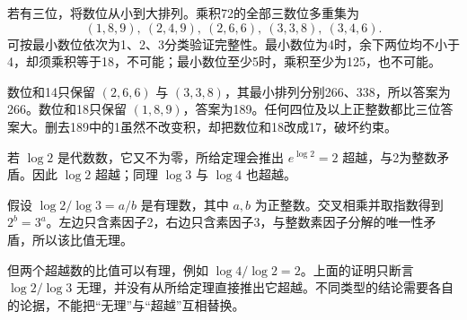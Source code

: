 若有三位，将数位从小到大排列。乘积72的全部三数位多重集为
\[
(1,8,9),\ (2,4,9),\ (2,6,6),\ (3,3,8),\ (3,4,6).
\]
可按最小数位依次为1、2、3分类验证完整性。最小数位为4时，余下两位均不小于4，却须乘积等于18，不可能；最小数位至少5时，乘积至少为125，也不可能。

数位和14只保留 $(2,6,6)$ 与 $(3,3,8)$，其最小排列分别266、338，所以答案为266。数位和18只保留 $(1,8,9)$，答案为189。任何四位及以上正整数都比三位答案大。删去189中的1虽然不改变积，却把数位和18改成17，破坏约束。

若 $\log2$ 是代数数，它又不为零，所给定理会推出 $e^{\log2}=2$ 超越，与2为整数矛盾。因此 $\log2$ 超越；同理 $\log3$ 与 $\log4$ 也超越。

假设 $\log2/\log3=a/b$ 是有理数，其中 $a,b$ 为正整数。交叉相乘并取指数得到 $2^b=3^a$。左边只含素因子2，右边只含素因子3，与整数素因子分解的唯一性矛盾，所以该比值无理。

但两个超越数的比值可以有理，例如 $\log4/\log2=2$。上面的证明只断言 $\log2/\log3$ 无理，并没有从所给定理直接推出它超越。不同类型的结论需要各自的论据，不能把“无理”与“超越”互相替换。
